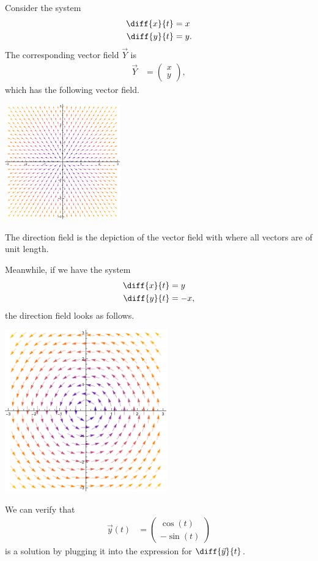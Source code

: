 \documentclass[10pt]{mypackage}
\begin{document}
\begin{example}
  Consider the system
  \begin{align*}
    \diff{x}{t} &= x\\
    \diff{y}{t} &= y.
  \end{align*}
  The corresponding vector field $\vec{Y}$ is
  \begin{align*}
    \vec{Y} &= \begin{pmatrix}x\\y\end{pmatrix},
  \end{align*}
  which has the following vector field.
  \begin{center}
    \includegraphics[width=5cm]{images/example_vector_field.pdf}
  \end{center}
  The direction field is the depiction of the vector field with where all vectors are of unit length.\newline

  Meanwhile, if we have the system
  \begin{align*}
    \diff{x}{t} &= y\\
    \diff{y}{t} &= -x,
  \end{align*}
  the direction field looks as follows.
  \begin{center}
    \includegraphics[width=7cm]{images/example_vector_field_2.pdf}
  \end{center}
  We can verify that 
  \begin{align*}
    \vec{y}(t) &= \begin{pmatrix}\cos(t)\\-\sin(t)\end{pmatrix}
  \end{align*}
  is a solution by plugging it into the expression for $\diff{\vec{y}}{t}$.
\end{example}
\end{document}
